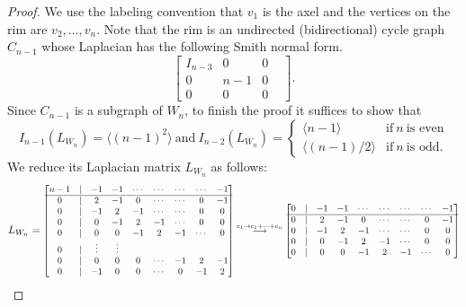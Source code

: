 \documentclass[11pt,reqno]{amsart}
\newcommand\scalemath[2]{\scalebox{#1}{\mbox{\ensuremath{\displaystyle #2}}}}
\theoremstyle{definition}
\theoremstyle{plain}
\begin{document}
\begin{proof}
We use the labeling convention that $v_1$ is the axel and the vertices on the rim are $v_2, \dots, v_{n}$.  
Note that the rim is an undirected (bidirectional) cycle graph $C_{n-1}$ whose Laplacian has the following Smith normal form.
\begin{equation*}
\left[
	\begin{array}{c|ccc}	
	I_{n-3} & 0 & 0 \\
	\hline
	0 & n-1 & 0 &\\
	0 & 0 & 0 &
	\end{array}
\right]. 
\end{equation*}
Since $C_{n-1}$ is a subgraph of $W_n$, to finish the proof it suffices to show that 
\begin{equation*}
I_{n-1}(L_{W_n}) = \langle (n-1)^2 \rangle~\text{and}~ I_{n-2}(L_{W_n}) = \begin{cases}
\langle n-1 \rangle & \text{if}~ n ~\text{is even} \\
\langle (n-1)/2\rangle & \text{if}~ n ~\text{is odd}.
\end{cases}
\end{equation*}
We reduce its Laplacian matrix $L_{W_n}$ as follows:
\[
L_{W_n}=\scalemath{0.85}{\begin{bmatrix}
	n-1 & | & -1 & -1 & \cdots & \cdots & \cdots & \cdots & -1 \\
	\hline
	0 & | & 2 & -1 & 0 & \cdots & \cdots & 0 & -1 \\
	0 & | & - 1& 2 & -1 & \cdots & \cdots & 0 & 0 \\
	0 & | & 0 & - 1& 2 & -1 & \cdots & 0 & 0 \\
	0 & | & 0 & 0 & - 1& 2 & -1 & \cdots & 0 \\
	0 & | & \vdots & \vdots \\
	0 & | & 0 & 0 & 0 & \cdots & -1& 2 & -1 \\
	0 & | & -1 & 0 & 0 & \cdots& 0 & -1 & 2 
\end{bmatrix} 
\stackrel{c_1 \to c_1 + \cdots + c_n}\longrightarrow \begin{bmatrix}
	0 & | & -1 & -1 & \cdots & \cdots & \cdots & \cdots & -1 \\
	\hline
	0 & | & 2 & -1 & 0 & \cdots & \cdots & 0 & -1 \\
	0 & | & - 1& 2 & -1 & \cdots & \cdots & 0 & 0 \\
	0 & | & 0 & - 1& 2 & -1 & \cdots & 0 & 0 \\
	0 & | & 0 & 0 & - 1& 2 & -1 & \cdots & 0 \\

\end{bmatrix}}\]
\end{proof}
\end{document}
